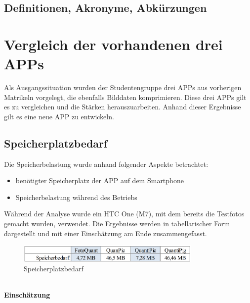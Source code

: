 \subsection{\textbf{Definitionen, Akronyme, Abkürzungen}}
\begin{acronym}[UV-Licht]


\end{acronym}

\section{Vergleich der vorhandenen drei APPs}


Als Ausgangssituation wurden der Studentengruppe drei \acs{APP}s aus vorherigen Matrikeln vorgelegt, die ebenfalls Bilddaten komprimieren. Diese drei \acs{APP}s gilt es zu vergleichen und die Stärken herauszuarbeiten. Anhand dieser Ergebnisse gilt es eine neue \acs{APP} zu entwickeln.

\subsection{\textbf{Speicherplatzbedarf}}

Die Speicherbelastung wurde anhand folgender Aspekte betrachtet: 
\begin{itemize}
\item benötigter Speicherplatz der APP auf dem Smartphone
\item Speicherbelastung während des Betriebs
\end{itemize}

Während der Analyse wurde ein HTC One (M7), mit dem bereits die Testfotos gemacht wurden, verwendet. Die Ergebnisse werden in tabellarischer Form dargestellt und mit einer Einschätzung am Ende zusammengefasst.\\
\begin{figure}[h]
	\centering
		\includegraphics[width=0.8\textwidth]{img/speicherplatzbedarf_klein.png}
	\caption[Speicherplatzbedarf]{Speicherplatzbedarf}
	\label{fig:speicher_apps}
\end{figure}
\\\textbf{Einschätzung}\\

